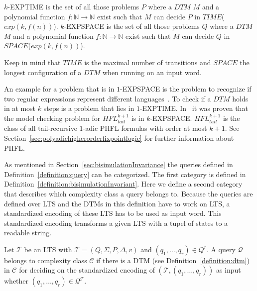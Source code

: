 \begin{definition}
    \label{definition:k_exptime_and_k_expspace}
    $k$-EXPTIME is the set of all those problems $P$ where a $\mathit{DTM}$ $M$ and a polynomial function $f: \mathbb{N}
    \rightarrow \mathbb{N}$ exist such that $M$ can decide $P$ in $\mathit{TIME}$($exp(k, f(n))$).
    $k$-EXPSPACE is the set of all those problems $Q$ where a $\mathit{DTM}$ $M$ and a polynomial function $f: \mathbb{N}
    \rightarrow \mathbb{N}$ exist such that $M$ can decide $Q$ in $\mathit{SPACE}$($exp(k, f(n))$).
\end{definition}

Keep in mind that $\mathit{TIME}$ is the maximal number of transitions and $\mathit{SPACE}$ the longest configuration of a
$\mathit{DTM}$ when running on an input word.

An example for a problem that is in $1$-EXPSPACE is the problem to recognize
if two regular expressions represent different languages~\cite{meyer1972equivalence}. To check if a $\mathit{DTM}$
holds in at most $k$ steps is a problem that lies in $1$-EXPTIME. In~\cite{bruse2017space} it was proven that the
model checking problem for $\mathit{HFL}^{k + 1}_{tail}$ is in $k$-EXPSPACE. $\mathit{HFL}^{k + 1}_{tail}$ is the
class of all tail-recursive $1$-adic PHFL formulas with order at most $k + 1$. See
Section~\ref{sec:polyadichigherorderfixpointlogic} for further information about PHFL.

As mentioned in Section~\ref{sec:bisimulationInvariance} the queries defined in Definition~\ref{definition:query} can be categorized. The first category is defined in Definition~\ref{definition:bisimulationInvariant}. Here we define a second category that describes which complexity class a query belongs to. Because the queries are defined over LTS and the DTMs in this definition have to work on LTS, a standardized encoding of these LTS has to be used as input word. This standardized encoding transforms a given LTS with a tupel of states to a readable string.

\begin{definition}
    \label{definition:queryBelongsToComplexityClass}
    Let $\mathcal{T}$ be an LTS with $\mathcal{T} = (Q, \Sigma, P, \Delta, v)$ and $(q_1, \dots, q_{r}) \in Q^r$.
    A query $\mathcal{Q}$ belongs to complexity class $\mathcal{C}$ if there is a DTM (see
    Definition~\ref{definition:dtm}) in $\mathcal{C}$ for deciding on the standardized encoding of $(\mathcal{T}, (q_1, \dots,
    q_{r}))$ as input whether $(q_1, \dots, q_{r}) \in \mathcal{Q}^\mathcal{T}$.
\end{definition}

